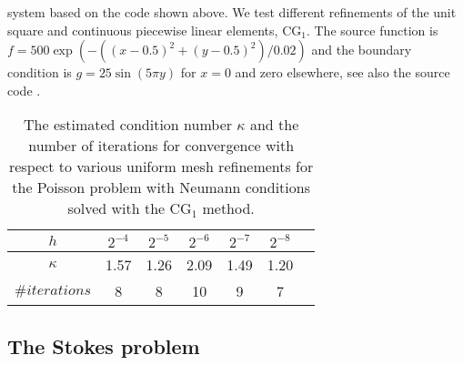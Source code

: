 system based on the code shown above. We test different
refinements of the unit square and continuous piecewise linear
elements, $\mathrm{CG}_1$. The source function is $f=
500\exp(-((x-0.5)^2 + (y-0.5)^2)/0.02)$ and the boundary condition is
$g = 25 \sin(5\pi y)$ for $x=0$ and zero elsewhere, see also the
source code .
\begin{table}
  \centering
  \begin{tabular}{ccccccc}
    \toprule
    $h$ & $2^{-4}$ & $2^{-5}$ & $2^{-6}$ & $2^{-7}$ & $2^{-8}$ \\
    \midrule
    $\kappa$ & 1.57 & 1.26 & 2.09 & 1.49 & 1.20 \\
    $\#iterations$ & 8 & 8 & 10 & 9 & 7 \\
    \bottomrule
  \end{tabular}
  \caption{The estimated condition number $\kappa$ and the number of
    iterations for convergence with respect to various uniform mesh
    refinements for the Poisson problem with Neumann conditions solved
    with the $\mathrm{CG}_1$ method.}\label{tabel:neumann}
\end{table}

\vspace*{-6pt}\subsection{The Stokes problem}

